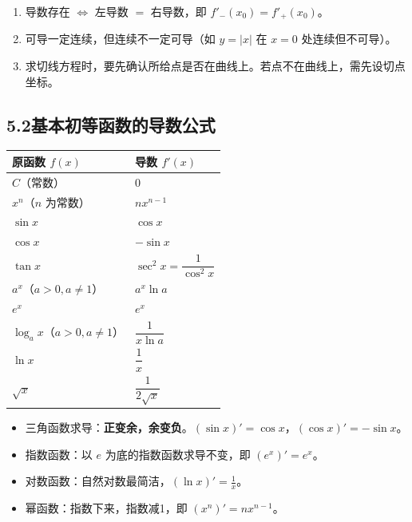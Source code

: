 \documentclass[12pt, a4paper]{ctexart}
\begin{document}
\begin{warnbox}[易错提醒]
\begin{enumerate}[leftmargin=2em]
  \item 导数存在 $\Leftrightarrow$ 左导数 $=$ 右导数，即 $f'_-(x_0) = f'_+(x_0)$。
  \item 可导一定连续，但连续不一定可导（如 $y = |x|$ 在 $x=0$ 处连续但不可导）。
  \item 求切线方程时，要先确认所给点是否在曲线上。若点不在曲线上，需先设切点坐标。
\end{enumerate}
\end{warnbox}

\subsection*{5.2\quad 基本初等函数的导数公式}

\begin{knowledgebox}[基本导数公式表]
\begin{center}
\renewcommand{\arraystretch}{1.6}
\begin{tabular}{>{\centering\arraybackslash}p{5cm} >{\centering\arraybackslash}p{7cm}}
\toprule
\textbf{原函数 $f(x)$} & \textbf{导数 $f'(x)$} \\
\midrule
$C$（常数） & $0$ \\
$x^n$（$n$ 为常数） & $nx^{n-1}$ \\
$\sin x$ & $\cos x$ \\
$\cos x$ & $-\sin x$ \\
$\tan x$ & $\sec^2 x = \dfrac{1}{\cos^2 x}$ \\
$a^x$（$a > 0, a \neq 1$） & $a^x \ln a$ \\
$e^x$ & $e^x$ \\
$\log_a x$（$a > 0, a \neq 1$） & $\dfrac{1}{x \ln a}$ \\
$\ln x$ & $\dfrac{1}{x}$ \\
$\sqrt{x}$ & $\dfrac{1}{2\sqrt{x}}$ \\
\bottomrule
\end{tabular}
\end{center}
\end{knowledgebox}

\begin{tipbox}[记忆技巧]
\begin{itemize}[leftmargin=2em]
  \item 三角函数求导：\textbf{正变余，余变负}。$(\sin x)' = \cos x$，$(\cos x)' = -\sin x$。
  \item 指数函数：以 $e$ 为底的指数函数求导不变，即 $(e^x)' = e^x$。
  \item 对数函数：自然对数最简洁，$(\ln x)' = \frac{1}{x}$。
  \item 幂函数：指数下来，指数减1，即 $(x^n)' = nx^{n-1}$。
\end{itemize}
\end{tipbox}
\end{document}
